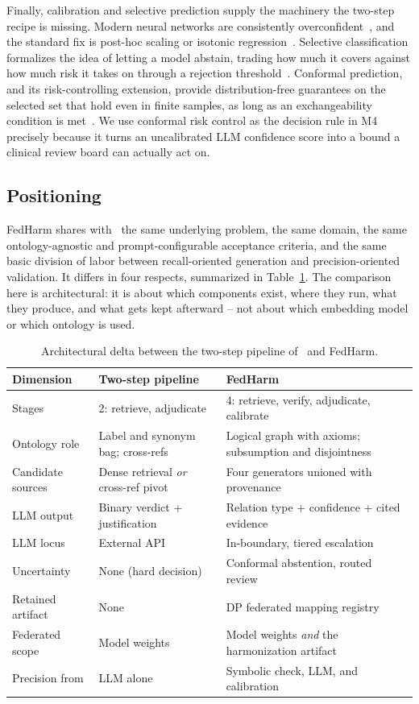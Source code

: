 \documentclass[conference]{IEEEtran}
\begin{document}
Finally, calibration and selective prediction supply the machinery the two-step recipe is missing. Modern neural networks are consistently overconfident~\cite{b19}, and the standard fix is post-hoc scaling or isotonic regression~\cite{b19,b47}. Selective classification formalizes the idea of letting a model abstain, trading how much it covers against how much risk it takes on through a rejection threshold~\cite{b20,b21}. Conformal prediction, and its risk-controlling extension, provide distribution-free guarantees on the selected set that hold even in finite samples, as long as an exchangeability condition is met~\cite{b23,b50,b22}. We use conformal risk control as the decision rule in M4 precisely because it turns an uncalibrated LLM confidence score into a bound a clinical review board can actually act on.

\subsection{Positioning}

FedHarm shares with~\cite{b1} the same underlying problem, the same domain, the same ontology-agnostic and prompt-configurable acceptance criteria, and the same basic division of labor between recall-oriented generation and precision-oriented validation. It differs in four respects, summarized in Table~\ref{tab:delta}. The comparison here is architectural: it is about which components exist, where they run, what they produce, and what gets kept afterward -- not about which embedding model or which ontology is used.

\begin{table}[t]
\caption{Architectural delta between the two-step pipeline of~\cite{b1} and FedHarm.}
\label{tab:delta}
\centering
\footnotesize
\begin{tabular}{@{}p{1.75cm}p{2.75cm}p{2.9cm}@{}}
\toprule
\textbf{Dimension} & \textbf{Two-step pipeline~\cite{b1}} & \textbf{FedHarm} \\
\midrule
Stages & 2: retrieve, adjudicate & 4: retrieve, verify, adjudicate, calibrate \\
Ontology role & Label and synonym bag; cross-refs & Logical graph with axioms; subsumption and disjointness \\
Candidate sources & Dense retrieval \emph{or} cross-ref pivot & Four generators unioned with provenance \\
LLM output & Binary verdict + justification & Relation type + confidence + cited evidence \\
LLM locus & External API & In-boundary, tiered escalation \\
Uncertainty & None (hard decision) & Conformal abstention, routed review \\
Retained artifact & None & DP federated mapping registry \\
Federated scope & Model weights & Model weights \emph{and} the harmonization artifact \\
Precision from & LLM alone & Symbolic check, LLM, and calibration \\
\bottomrule
\end{tabular}
\end{table}
\end{document}
